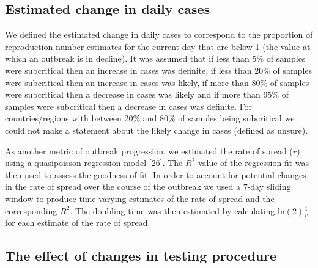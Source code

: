 \documentclass[]{article}
\begin{document}
\hypertarget{estimated-change-in-daily-cases}{%
\subsection{Estimated change in daily
cases}\label{estimated-change-in-daily-cases}}

We defined the estimated change in daily cases to correspond to the
proportion of reproduction number estimates for the current day that are
below 1 (the value at which an outbreak is in decline). It was assumed
that if less than 5\% of samples were subcritical then an increase in
cases was definite, if less than 20\% of samples were subcritical then
an increase in cases was likely, if more than 80\% of samples were
subcritical then a decrease in cases was likely and if more than 95\% of
samples were subcritical then a decrease in cases was definite. For
countries/regions with between 20\% and 80\% of samples being
subcritical we could not make a statement about the likely change in
cases (defined as unsure).

As another metric of outbreak progression, we estimated the rate of
spread (\(r\)) using a quasipoisson regression model {[}26{]}. The
\(R^2\) value of the regression fit was then used to assess the
goodness-of-fit. In order to account for potential changes in the rate
of spread over the course of the outbreak we used a 7-day sliding window
to produce time-varying estimates of the rate of spread and the
corresponding \(R^2\). The doubling time was then estimated by
calculating \(\text{ln}(2) \frac{1}{r}\) for each estimate of the rate
of spread.

\hypertarget{the-effect-of-changes-in-testing-procedure}{%
\subsection{The effect of changes in testing
procedure}\label{the-effect-of-changes-in-testing-procedure}}
\end{document}
